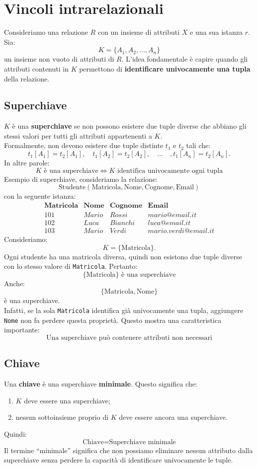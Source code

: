 
\section{Vincoli intrarelazionali}
Consideriamo una relazione $R$ con un insieme di attributi $X$ e una
sua istanza $r$.
Sia:
\[
K = \{A_1, A_2, \ldots, A_n\}
\]
un insieme non vuoto di attributi di $R$.
L'idea fondamentale è capire quando gli attributi contenuti in $K$
permettono di \textbf{identificare univocamente una tupla} della relazione.
\subsection{Superchiave}
$K$ è una \textbf{superchiave} se non possono esistere due tuple diverse
che abbiano gli stessi valori per tutti gli attributi appartenenti a $K$.\\
Formalmente, non devono esistere due tuple distinte $t_1$ e $t_2$ tali che:
\[
t_1[A_1] = t_2[A_1],
\quad
t_1[A_2] = t_2[A_2],
\quad \ldots \quad,
t_1[A_n] = t_2[A_n].
\]
In altre parole:
\[
\boxed{
K \text{ è una superchiave}
\iff
K \text{ identifica univocamente ogni tupla}
}
\]
\textcolor{verdeEsempio}{Esempio} di superchiave,
consideriamo la relazione:
\[
\text{Studente}(\text{Matricola},\text{Nome},\text{Cognome},\text{Email})
\]
con la seguente istanza:
\[
\begin{array}{c|c|c|c}
\textbf{Matricola} & \textbf{Nome} & \textbf{Cognome} & \textbf{Email} \\ \hline
101 & Mario & Rossi & mario@email.it \\
102 & Luca & Bianchi & luca@email.it \\
103 & Mario & Verdi & mario.verdi@email.it
\end{array}
\]
Consideriamo:
\[
K = \{\text{Matricola}\}.
\]
Ogni studente ha una matricola diversa, quindi non esistono due tuple
diverse con lo stesso valore di \texttt{Matricola}.
Pertanto:
\[
\boxed{\{\text{Matricola}\} \text{ è una superchiave}}
\]
Anche:
\[
\{\text{Matricola},\text{Nome}\}
\]
è una superchiave.\\
Infatti, se la sola \texttt{Matricola} identifica già univocamente una
tupla, aggiungere \texttt{Nome} non fa perdere questa proprietà.
Questo mostra una caratteristica importante:
\[
\boxed{
\text{Una superchiave può contenere attributi non necessari}
}
\]
\subsection{Chiave}
Una \textbf{chiave} è una superchiave \textbf{minimale}.
Questo significa che:
\begin{enumerate}
    \item $K$ deve essere una superchiave;
    \item nessun sottoinsieme proprio di $K$ deve essere ancora una superchiave.
\end{enumerate}
\noindent Quindi:
\[
\boxed{
\text{Chiave}
=
\text{Superchiave minimale}
}
\]
Il termine ``minimale'' significa che non possiamo eliminare nessun
attributo dalla superchiave senza perdere la capacità di identificare
univocamente le tuple.
